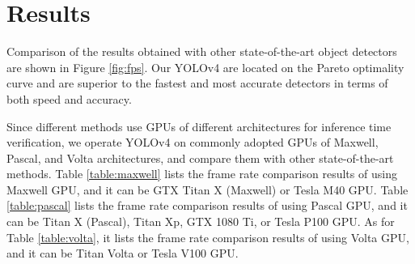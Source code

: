 \documentclass[10pt,twocolumn,letterpaper]{article}
\begin{document}
\section{Results}

Comparison of the results obtained with other state-of-the-art object detectors are shown in Figure \ref{fig:fps}. Our YOLOv4 are located on the Pareto optimality curve and are superior to the fastest and most accurate detectors in terms of both speed and accuracy.

Since different methods use GPUs of different architectures for inference time verification, we operate YOLOv4 on commonly adopted GPUs of Maxwell, Pascal, and Volta architectures, and compare them with other state-of-the-art methods. Table \ref{table:maxwell} lists the frame rate comparison results of using Maxwell GPU, and it can be GTX Titan X (Maxwell) or Tesla M40 GPU. Table \ref{table:pascal} lists the frame rate comparison results of using Pascal GPU, and it can be Titan X (Pascal), Titan Xp, GTX 1080 Ti, or Tesla P100 GPU. As for Table \ref{table:volta}, it lists the frame rate comparison results of using Volta GPU, and it can be Titan Volta or Tesla V100 GPU.
\end{document}
